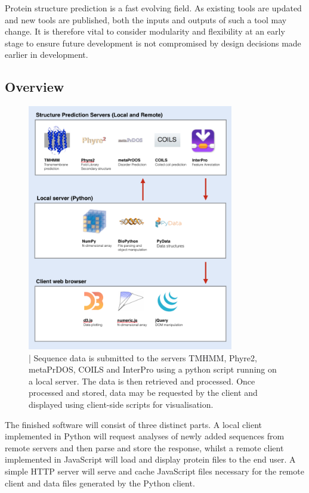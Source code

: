 \documentclass[fleqn,10pt]{article} %
\begin{document}

Protein structure prediction is a fast evolving field. As existing tools are updated and new tools are published, both the inputs and outputs of such a tool may change. It is therefore vital to consider modularity and flexibility at an early stage to ensure future development is not compromised by design decisions made earlier in development.

\subsection{Overview}

\begin{figure}
\includegraphics[width=9cm]{figs/softwareoverview}
\caption{ | Sequence data is submitted to the servers TMHMM, Phyre2, metaPrDOS, COILS and InterPro using a python script running on a local server. The data is then retrieved and processed. Once processed and stored, data may be requested by the client and displayed using client-side scripts for visualisation.}
\end{figure}

The finished software will consist of three distinct parts. A local client implemented in Python will request analyses of newly added sequences from remote servers and then parse and store the response, whilst a remote client implemented in JavaScript will load and display protein files to the end user. A simple HTTP server will serve and cache JavaScript files necessary for the remote client and data files generated by the Python client.
\end{document}
